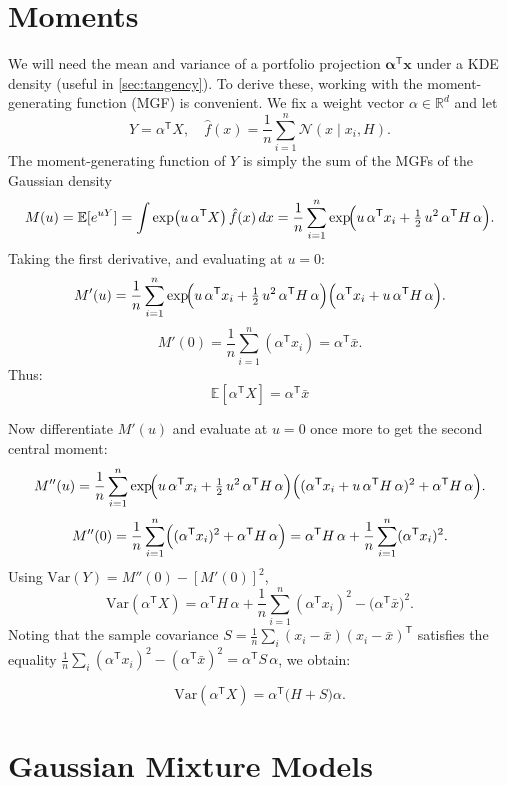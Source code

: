 \section{Moments}
\label{sec:momentsec}
We will need the mean and variance of a portfolio projection $\mathbf{\alpha^{\mathsf{T}}x}$ under a KDE density (useful in \ref{sec:tangency}). To derive these, working with the moment-generating function (MGF) is convenient. We fix a weight vector $\alpha\in\mathbb R^d$ and let
$$
Y=\alpha^{\mathsf{T}} X,\quad
\hat f(x)=\frac1n\sum_{i=1}^n\mathcal N(x\mid x_i,H).
$$
The moment-generating function of $Y$ is simply the sum of the MGFs of the Gaussian density
$$
M(u)=\mathbb E[e^{uY}]
=\int \exp\bigl(u\,\alpha^{\mathsf{T}} X\bigr)\,\hat f(x)\,dx
=\frac1n\sum_{i=1}^n\exp\!\Bigl(u\,\alpha^{\mathsf{T}} x_i+\tfrac12\,u^2\,\alpha^{\mathsf{T}} H\,\alpha\Bigr).
$$
Taking the first derivative, and evaluating at $u=0$:
$$
M'(u)
=\frac1n\sum_{i=1}^n
\exp\!\Bigl(u\,\alpha^{\mathsf{T}} x_i+\tfrac12\,u^2\,\alpha^{\mathsf{T}} H\,\alpha\Bigr)
\Bigl(\alpha^{\mathsf{T}} x_i+u\,\alpha^{\mathsf{T}} H\,\alpha\Bigr).
$$
$$
M'(0)
=\frac1n\sum_{i=1}^n(\alpha^{\mathsf{T}} x_i)
=\alpha^{\mathsf{T}}\bar x.
$$
Thus:
$$\mathbb{E}[\alpha^{\mathsf{T}} X] = \alpha^{\mathsf{T}} \bar x$$

Now differentiate $M'(u)$ and evaluate at $u=0$ once more to get the second central moment:
$$
M''(u)
=\frac1n\sum_{i=1}^n
\exp\!\Bigl(u\,\alpha^{\mathsf{T}} x_i+\tfrac12\,u^2\,\alpha^{\mathsf{T}} H\,\alpha\Bigr)
\Bigl((\alpha^{\mathsf{T}} x_i+u\,\alpha^{\mathsf{T}} H\,\alpha)^2
+\alpha^{\mathsf{T}} H\,\alpha\Bigr).
$$
$$
M''(0)
=\frac1n\sum_{i=1}^n\Bigl((\alpha^{\mathsf{T}} x_i)^2+\alpha^{\mathsf{T}} H\,\alpha\Bigr)
=\alpha^{\mathsf{T}} H\,\alpha+\frac1n\sum_{i=1}^n(\alpha^{\mathsf{T}} x_i)^2.
$$
Using $\mathrm{Var}(Y)=M''(0)-[M'(0)]^2$,
$$
\mathrm{Var}(\alpha^{\mathsf{T}} X)
=\alpha^{\mathsf{T}} H\,\alpha
+\frac1n\sum_{i=1}^n(\alpha^{\mathsf{T}} x_i)^2
-\bigl(\alpha^{\mathsf{T}}\bar x\bigr)^2.
$$
Noting that the sample covariance $S=\frac1n\sum_i(x_i-\bar x)(x_i-\bar x)^{\mathsf{T}}$ satisfies the equality
$\frac1n\sum_i(\alpha^{\mathsf{T}} x_i)^2-(\alpha^{\mathsf{T}}\bar x)^2=\alpha^{\mathsf{T}} S\,\alpha$, we obtain:

\begin{equation}\label{eq:kdevar}
  \mathrm{Var}(\alpha^{\mathsf{T}} X)=\alpha^{\mathsf{T}}\bigl(H+S\bigr)\alpha.
\end{equation}


\section{Gaussian Mixture Models}
